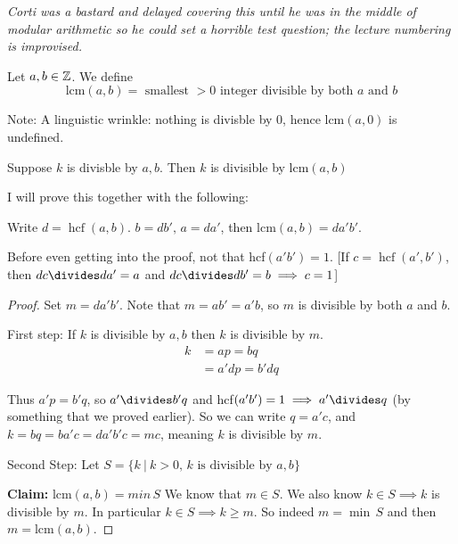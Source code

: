 \documentclass[10pt]{scrartcl}
\DeclareMathOperator{\hcf}{hcf}
\begin{document}
\emph{Corti was a bastard and delayed covering this until he was in the middle of modular arithmetic so he could set a horrible test question; the lecture numbering is improvised.}\\
\begin{definition} 
Let $a,b \in\mathbb{Z}$. We define  
\[\text{lcm}(a,b) = \mbox{ smallest $> 0$ integer divisible by both $a$ and $b$}\]	
\end{definition}

Note: A linguistic wrinkle: nothing is divisble by $0$, hence lcm$(a,0)$ is undefined. 

\begin{proposition}
Suppose $k$ is divisble by $a,b$. Then $k$ is divisible by lcm$(a,b)$	
\end{proposition}

I will prove this together with the following:

\begin{proposition}
Write $d = \hcf(a,b)$. $b = db',\, a = da'$, then $\text{lcm}(a,b) = da'b'$. 	
\end{proposition}

Before even getting into the proof, not that hcf$(a'b') = 1$. [If $c = \hcf(a',b')$, then $dc \divides da' = a$ and $dc \divides db' = b \implies c = 1$]

\begin{proof}
Set $m = da'b'$. Note that $m = ab' = a'b$, so $m$ is divisible by both $a$ and $b$. 

First step: If $k$ is divisible by $a,b$ then $k$ is divisible by $m$. 
\[
\begin{aligned}
  k &= ap = bq\\
  &= a'dp = b'dq
\end{aligned}
\]

Thus $a'p = b'q$, so $a'\divides b'q$ and hcf$(a'b') =1 \implies a'\divides q$ (by something that we proved earlier). So we can write $q = a'c$, and $
  k = bq = ba'c = da'b'c = mc$, meaning $k$ is divisible by $m$. 

Second Step: Let $S = \{k ~|~ k>0,\, k \text{ is divisible by } a,b\}$

\textbf{Claim:} lcm$(a,b) = min \,S$ We know that $m \in S$. We also know $k \in S \implies k$ is divisible by $m$. In particular $k \in S \implies k \geq m$. So indeed $m = \min\,S$ and then $m = \text{lcm}(a,b)$. 
\end{proof}\vspace*{5pt}
\end{document}
